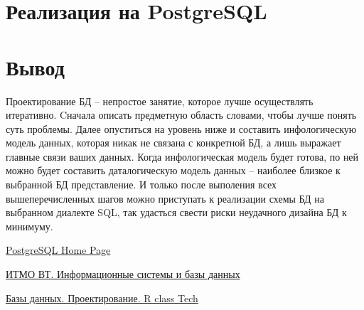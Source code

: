 \documentclass{article}
\begin{document}
\section{Реализация на PostgreSQL}



\section{Вывод}

Проектирование БД -- непростое занятие, которое
лучше осуществлять итеративно. Cначала 
описать предметную область словами, чтобы лучше
понять суть проблемы. Далее опуститься на уровень 
ниже и составить инфологическую модель данных, 
которая никак не связана с конкретной БД, а
лишь выражает главные связи ваших данных.
Когда инфологическая модель будет готова, 
по ней можно будет составить даталогическую
модель данных -- наиболее близкое к выбранной
БД представление. И только после выполения всех
вышеперечисленных шагов можно приступать 
к реализации схемы БД на выбранном диалекте SQL,
так удасться свести риски неудачного дизайна БД
к минимуму.

\begin{thebibliography}{9}
    \item \href{https://www.postgresql.org}{
        PostgreSQL Home Page}

    \item \href{https://se.ifmo.ru/documents/10180/733702/isbd-2021-2.6.pdf/e47a2e01-d445-e017-070f-a300ecdb71a8}{
        ИТМО ВТ. Информационные системы и базы данных}

    \item \href{https://youtu.be/HnRXzrg3Sd4?si=Il3rxvHIpw93Wx0J}{
        Базы данных. Проектирование. R class Tech}
\end{thebibliography}
\end{document}
